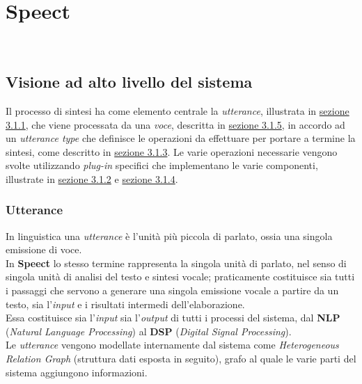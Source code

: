 
\chapter{Speect}
\label{cap:speect}

 \\


\section{Visione ad alto livello del sistema}
Il processo di sintesi ha come elemento centrale la \textit{utterance}, illustrata in \hyperref[subsec:utterance]{sezione 3.1.1}, 
che viene processata da una \textit{voce}, 
descritta in \hyperref[subsec:voice]{sezione 3.1.5}, in accordo ad un \textit{utterance type} che definisce le operazioni 
da effettuare per portare a termine la sintesi, 
come descritto in \hyperref[subsec:utttype]{sezione 3.1.3}. Le varie operazioni necessarie vengono svolte utilizzando \textit{plug-in} 
specifici che implementano le varie componenti, illustrate in \hyperref[subsec:uttproc]{sezione 3.1.2} e \hyperref[subsec:featproc]{sezione 3.1.4}.
   \subsection{Utterance}
   \label{subsec:utterance}
   In linguistica una \textit{utterance} è l'unità più piccola di parlato, ossia una singola emissione di voce. \\
   In \textbf{Speect} lo stesso termine rappresenta la singola unità di parlato, nel senso di singola unità di analisi del testo
   e sintesi vocale; praticamente costituisce sia tutti i passaggi che servono a generare una singola emissione vocale a partire
   da un testo, sia l'\textit{input} e i risultati intermedi dell'elaborazione. \\
   Essa costituisce sia l'\textit{input} sia l'\textit{output} di tutti i processi del sistema,
   dal \textbf{NLP} (\textit{Natural Language Processing}) al \textbf{DSP} (\textit{Digital Signal Processing}). \\
   Le \textit{utterance} vengono modellate internamente dal sistema come \textit{Heterogeneous Relation Graph} (struttura dati esposta
   in seguito),
   grafo al quale le varie parti del sistema aggiungono informazioni.
